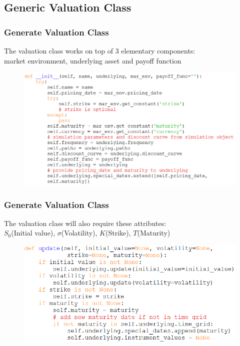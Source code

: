 \documentclass{beamer}
\begin{document}
\subsection{Generic Valuation Class}

\begin{frame}
\frametitle{Generate Valuation Class}
The valuation class works on top of 3 elementary components:\\
market environment, underlying asset and payoff function
\begin{figure}[H]
	\includegraphics[scale=0.42]{init_generic_valuation_class.png}
\end{figure}
\end{frame}

\begin{frame}
\frametitle{Generate Valuation Class}
The valuation class will also require these attributes:\\
$S_{0}$(Initial value), $\sigma$(Volatility), $K$(Strike), $T$(Maturity)
\begin{figure}[H]
	\includegraphics[scale=0.5]{update_valuation_class.png}
\end{figure}
\end{frame}
\end{document}
